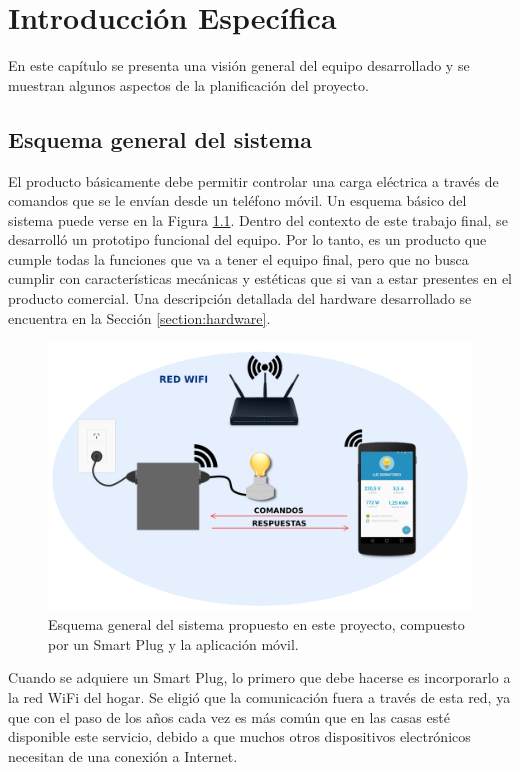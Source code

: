 \chapter{Introducción Específica} %

\label{Chapter2}

En este capítulo se presenta una visión general del equipo desarrollado y se muestran algunos aspectos de la planificación del proyecto.


\section{Esquema general del sistema}

El producto básicamente debe permitir controlar una carga eléctrica a través de comandos que se le envían desde un teléfono móvil. Un esquema básico del sistema puede verse en la Figura \ref{fig:esquema_sistema}. Dentro del contexto de este trabajo final, se desarrolló un prototipo funcional del equipo. Por lo tanto, es un producto que cumple todas la funciones que va a tener el equipo final, pero que no busca cumplir con características mecánicas y estéticas que si van a estar presentes en el producto comercial. Una descripción detallada del hardware desarrollado se encuentra en la Sección \ref{section:hardware}.

\begin{figure}[h]
	\centering
	\includegraphics[width=12cm]{./Figures/2_1_esquema_sistema.png}
	\caption{Esquema general del sistema propuesto en este proyecto, compuesto por un Smart Plug y la aplicación móvil.}
	\label{fig:esquema_sistema}
\end{figure}

Cuando se adquiere un Smart Plug, lo primero que debe hacerse es incorporarlo a la red WiFi del hogar. Se eligió que la comunicación fuera a través de esta red, ya que con el paso de los años cada vez es más común que en las casas esté disponible este servicio, debido a que muchos otros dispositivos electrónicos necesitan de una conexión a Internet.

